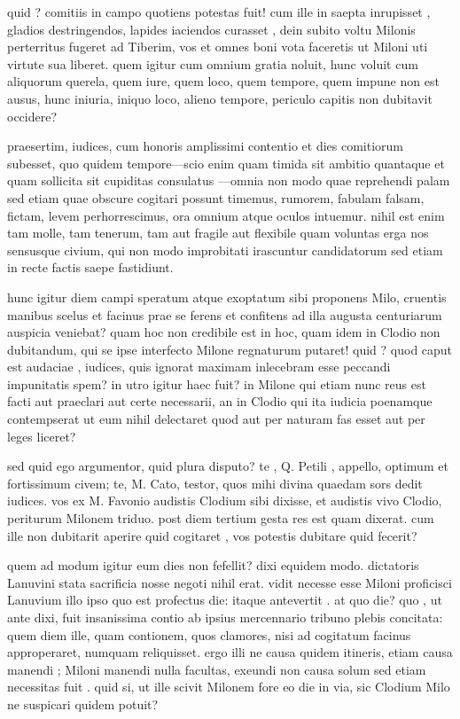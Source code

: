  quid ? comitiis in campo quotiens potestas fuit! cum ille in saepta inrupisset , gladios destringendos, lapides iaciendos curasset , dein subito voltu Milonis perterritus fugeret ad Tiberim, vos et omnes boni vota faceretis ut Miloni uti virtute sua liberet. quem igitur cum omnium gratia noluit, hunc voluit cum aliquorum querela, quem iure, quem loco, quem tempore, quem impune non est ausus, hunc iniuria, iniquo loco, alieno tempore, periculo capitis non dubitavit occidere?

 praesertim, iudices, cum honoris amplissimi contentio et dies comitiorum subesset, quo quidem tempore—scio enim quam timida sit ambitio quantaque et quam sollicita sit cupiditas consulatus —omnia non modo quae reprehendi palam sed etiam quae obscure cogitari possunt timemus, rumorem, fabulam falsam, fictam, levem perhorrescimus, ora omnium atque oculos intuemur. nihil est enim tam molle, tam tenerum, tam aut fragile aut flexibile quam voluntas erga nos sensusque civium, qui non modo improbitati irascuntur candidatorum sed etiam in recte factis saepe fastidiunt.

 hunc igitur diem campi speratum atque exoptatum sibi proponens Milo, cruentis manibus scelus et facinus prae se ferens et confitens ad illa augusta centuriarum auspicia veniebat? quam hoc non credibile est in hoc, quam idem in Clodio non dubitandum, qui se ipse interfecto Milone regnaturum putaret! quid ? quod caput est audaciae , iudices, quis ignorat maximam inlecebram esse peccandi impunitatis spem? in utro igitur haec fuit? in Milone qui etiam nunc reus est facti aut praeclari aut certe necessarii, an in Clodio qui ita iudicia poenamque contempserat ut eum nihil delectaret quod aut per naturam fas esset aut per leges liceret?

 sed quid ego argumentor, quid plura disputo? te , Q. Petili , appello, optimum et fortissimum civem; te, M. Cato, testor, quos mihi divina quaedam sors dedit iudices. vos ex M. Favonio audistis Clodium sibi dixisse, et audistis vivo Clodio, periturum Milonem triduo. post diem tertium gesta res est quam dixerat. cum ille non dubitarit aperire quid cogitaret , vos potestis dubitare quid fecerit?

 quem ad modum igitur eum dies non fefellit? dixi equidem modo. dictatoris Lanuvini stata sacrificia nosse negoti nihil erat. vidit necesse esse Miloni proficisci Lanuvium illo ipso quo est profectus die: itaque antevertit . at quo die? quo , ut ante dixi, fuit insanissima contio ab ipsius mercennario tribuno plebis concitata: quem diem ille, quam contionem, quos clamores, nisi ad cogitatum facinus approperaret, numquam reliquisset. ergo illi ne causa quidem itineris, etiam causa manendi ; Miloni manendi nulla facultas, exeundi non causa solum sed etiam necessitas fuit . quid si, ut ille scivit Milonem fore eo die in via, sic Clodium Milo ne suspicari quidem potuit?

